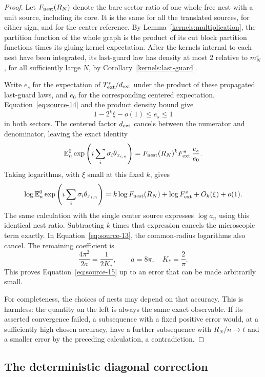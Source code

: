\begin{proof}
Let \(F_{\rm nest}(R_N)\) denote the bare sector ratio of one whole
free nest with a unit source, including its core.  It is the same
for all the translated sources, for either sign, and for the
center reference.  By Lemma~\ref{kernels:multiplication}, the
partition function of the whole graph is the product of its cut
block partition functions times its gluing-kernel expectation.
After the kernels internal to each nest have been integrated, its
last-guard law has density at most \(2\) relative to \(m_N^s\),
for all sufficiently large \(N\), by
Corollary~\ref{kernels:last-guard}.

Write \(e_s\) for the expectation of
\(T_{\rm ext}^s/d_{\rm ext}\) under the product of these propagated
last-guard laws, and \(e_0\) for the corresponding centered
expectation.  Equation~\eqref{eq:source-14} and the product density
bound give
\[
 1-2^k\xi-o(1)\leq e_s\leq1
\]
in both sectors.  The centered factor \(d_{\rm ext}\) cancels
between the numerator and denominator, leaving the exact identity
\[
 \mathbb E_n^0\exp\left(i\sum_i\sigma_i\theta_{x_{i,n}}\right)
 =F_{\rm nest}(R_N)^k F_{\rm ext}^s\,\frac{e_s}{e_0}.
\]
Taking logarithms, with \(\xi\) small at this fixed \(k\), gives
\[
 \log\mathbb E_n^0\exp\left(i\sum_i\sigma_i\theta_{x_{i,n}}\right)
 =k\log F_{\rm nest}(R_N)+\log F_{\rm ext}^s
                         +O_k(\xi)+o(1).
\]
The same calculation with the single center source expresses
\(\log a_n\) using this identical nest ratio.  Subtracting \(k\)
times that expression cancels the microscopic term exactly.
In Equation~\eqref{eq:source-13}, the common-radius logarithms
also cancel.  The remaining coefficient is
\[
 \frac{4\pi^2}{2a}=\frac1{2K_*},
 \qquad a=8\pi,\quad K_*=\frac2\pi.
\]
This proves Equation~\eqref{eq:source-15} up to an error that can
be made arbitrarily small.

For completeness, the choices of nests may depend on that accuracy.
This is harmless: the quantity on the left is always the same exact
observable.  If its asserted convergence failed, a subsequence with
a fixed positive error would, at a sufficiently high chosen accuracy,
have a further subsequence with \(R_N/n\to t\) and a smaller error
by the preceding calculation, a contradiction.
\end{proof}

\subsection{The deterministic diagonal correction}

